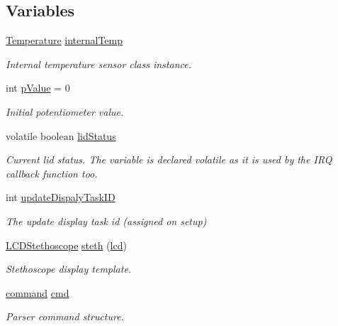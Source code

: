 \subsection*{Variables}
\begin{DoxyCompactItemize}
\item 
\hyperlink{class_temperature}{Temperature} \hyperlink{_meditech___chip_kit_control_panel_8pde_adcfca3504612462229db71750def77f9}{internal\-Temp}
\begin{DoxyCompactList}\small\item\em Internal temperature sensor class instance. \end{DoxyCompactList}\item 
int \hyperlink{_meditech___chip_kit_control_panel_8pde_a3134d7e85042180eb421c3f6ee88d3b3}{p\-Value} = 0
\begin{DoxyCompactList}\small\item\em Initial potentiometer value. \end{DoxyCompactList}\item 
volatile boolean \hyperlink{_meditech___chip_kit_control_panel_8pde_adea51712174a5f82a31231a67e0d4608}{lid\-Status}
\begin{DoxyCompactList}\small\item\em Current lid status. The variable is declared volatile as it is used by the I\-R\-Q callback function too. \end{DoxyCompactList}\item 
int \hyperlink{_meditech___chip_kit_control_panel_8pde_a527a89c41abb1d8660b53f5e727e655c}{update\-Dispaly\-Task\-I\-D}
\begin{DoxyCompactList}\small\item\em The update display task id (assigned on setup) \end{DoxyCompactList}\item 
\hyperlink{class_l_c_d_stethoscope}{L\-C\-D\-Stethoscope} \hyperlink{_meditech___chip_kit_control_panel_8pde_ac2215fe61cf27d0fc83fa54cf1db73fc}{steth} (\hyperlink{_meditech___chip_kit_control_panel_8pde_ae0b100905fb0ed88dddaafda0aa05379}{lcd})
\begin{DoxyCompactList}\small\item\em Stethoscope display template. \end{DoxyCompactList}\item 
\hyperlink{_command_processor_8h_a9e0992eae3950adccaf4847fbff4231d}{command} \hyperlink{_meditech___chip_kit_control_panel_8pde_a9ec7ba7a86dba057afdae246ca1ac40e}{cmd}
\begin{DoxyCompactList}\small\item\em Parser command structure. \end{DoxyCompactList}\end{DoxyCompactItemize}


